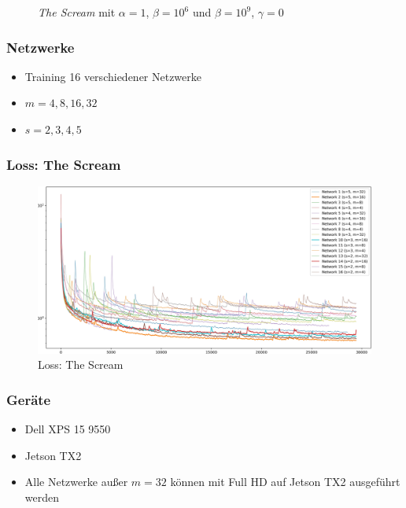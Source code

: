 \begin{frame}
\begin{figure}[H]
\begin{subfigure}[h]{0.49\textwidth}
        \end{subfigure}
        \caption{\textit{The Scream} mit $ \alpha = 1 $, $ \beta = 10^{6} $ und $ \beta = 10^{9} $, $ \gamma = 0 $}
    \end{figure}
\end{frame}

\begin{frame}
    \frametitle{Netzwerke}

    \begin{itemize}
        \item Training 16 verschiedener Netzwerke \pause
        \item $ m = {4, 8, 16, 32} $
        \item $ s = {2, 3, 4, 5} $
    \end{itemize}
\end{frame}

\begin{frame}
    \frametitle{Loss: The Scream}

    \begin{figure}[H]
        \centering
        \includegraphics[width=1.00\textwidth]{resources/content/experiments/fast_loss_plot_experiment2.jpg}
        \caption{Loss: The Scream}
        \label{img:results_the_scream}
    \end{figure}    
\end{frame}

\begin{frame}
    \frametitle{Geräte}
    
    \begin{itemize}
        \item Dell XPS 15 9550
        \item Jetson TX2 \pause
        \item Alle Netzwerke außer $ m = 32 $ können mit Full HD auf Jetson TX2 ausgeführt werden
    \end{itemize}
\end{frame}